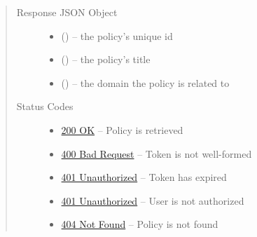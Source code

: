 \documentclass[letterpaper,10pt,english]{sphinxmanual}
\begin{document}
\begin{fulllineitems}
\begin{quote}
\begin{description}
\begin{itemize}
\end{itemize}

\item[{Response JSON Object}] \leavevmode\begin{itemize}
\item {} 
 () -- the policy's unique id

\item {} 
 () -- the policy's title

\item {} 
 () -- the domain the policy is related to

\end{itemize}

\item[{Status Codes}] \leavevmode\begin{itemize}
\item {} 
\href{http://www.w3.org/Protocols/rfc2616/rfc2616-sec10.html\#sec10.2.1}{200 OK} -- Policy is retrieved

\item {} 
\href{http://www.w3.org/Protocols/rfc2616/rfc2616-sec10.html\#sec10.4.1}{400 Bad Request} -- Token is not well-formed

\item {} 
\href{http://www.w3.org/Protocols/rfc2616/rfc2616-sec10.html\#sec10.4.2}{401 Unauthorized} -- Token has expired

\item {} 
\href{http://www.w3.org/Protocols/rfc2616/rfc2616-sec10.html\#sec10.4.2}{401 Unauthorized} -- User is not authorized

\item {} 
\href{http://www.w3.org/Protocols/rfc2616/rfc2616-sec10.html\#sec10.4.5}{404 Not Found} -- Policy is not found

\end{itemize}

\end{description}\end{quote}

\end{fulllineitems}
\end{document}
